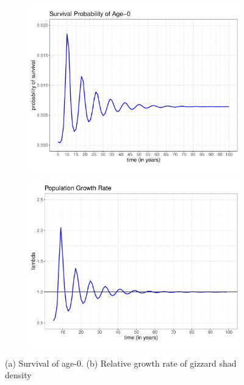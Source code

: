 \documentclass[preprint,review,12pt,authoryear]{elsarticle}
\begin{document}
\begin{figure}
\centering
\begin{subfigure}[b]{.43\textwidth}
  \includegraphics[width=\textwidth]{figures/Figure2a.pdf}
   \caption{}
  \label{fig:age0time}
\end{subfigure}
\begin{subfigure}[b]{.43\textwidth}
   \includegraphics[width=\textwidth]{figures/Figure2b.pdf}
     \caption{}
\label{fig:lambda}
\end{subfigure}
\caption{(a) Survival of age-0. (b) Relative growth rate of gizzard shad density}
\end{figure}    
\end{document}
